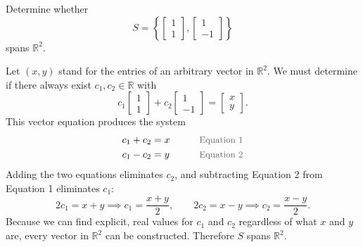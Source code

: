 \begin{example}
Determine whether
\[
S = \left\{ \begin{bmatrix} 1 \\ 1 \end{bmatrix}, \begin{bmatrix} 1 \\ -1 \end{bmatrix} \right\}
\]
spans $\mathbb{R}^2$.

\begin{solution}
Let $(x, y)$ stand for the entries of an arbitrary vector in $\mathbb{R}^2$. We must determine if there always exist $c_1, c_2 \in \mathbb{R}$ with
\[
c_1 \begin{bmatrix} 1 \\ 1 \end{bmatrix} + c_2 \begin{bmatrix} 1 \\ -1 \end{bmatrix} = \begin{bmatrix} x \\ y \end{bmatrix}.
\]
This vector equation produces the system
\begin{alignat*}{2}
c_1 + c_2 &= x &\qquad& \by{Equation 1} \\
c_1 - c_2 &= y && \by{Equation 2}
\end{alignat*}
Adding the two equations eliminates $c_2$, and subtracting Equation 2 from Equation 1 eliminates $c_1$:
\[
2c_1 = x + y \implies c_1 = \frac{x + y}{2},
\qquad
2c_2 = x - y \implies c_2 = \frac{x - y}{2}.
\]
Because we can find explicit, real values for $c_1$ and $c_2$ regardless of what $x$ and $y$ are, every vector in $\mathbb{R}^2$ can be constructed. Therefore $S$ spans $\mathbb{R}^2$.
\end{solution}
\end{example}

